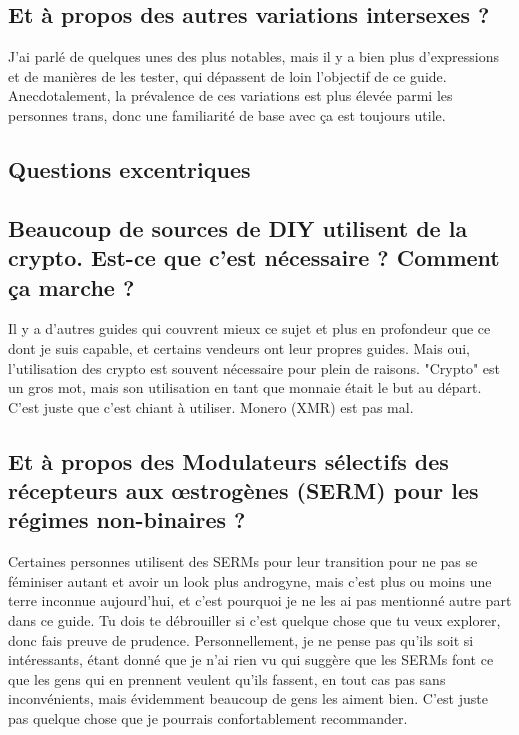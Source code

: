 \documentclass{article}
\begin{document}
\subsection{Et à propos des autres variations intersexes ?}

J'ai parlé de quelques unes des plus notables, mais il y a bien plus d'expressions et de manières de les tester, qui dépassent de loin l'objectif de ce guide. Anecdotalement, la prévalence de ces variations est plus élevée parmi les personnes trans, donc une familiarité de base avec ça est toujours utile.

\subsection*{Questions excentriques}

\subsection{Beaucoup de sources de DIY utilisent de la crypto. Est-ce que c'est nécessaire ? Comment ça marche ?}

Il y a d'autres guides qui couvrent mieux ce sujet et plus en profondeur que ce dont je suis capable, et certains vendeurs ont leur propres guides. Mais oui, l'utilisation des crypto est souvent nécessaire pour plein de raisons. "Crypto" est un gros mot, mais son utilisation en tant que monnaie était le but au départ. C'est juste que c'est chiant à utiliser. Monero (XMR) est pas mal.

\subsection{Et à propos des Modulateurs sélectifs des récepteurs aux œstrogènes (SERM) pour les régimes non-binaires ?}

Certaines personnes utilisent des SERMs pour leur transition pour ne pas se féminiser autant et avoir un look plus androgyne, mais c'est plus ou moins une terre inconnue aujourd'hui, et c'est pourquoi je ne les ai pas mentionné autre part dans ce guide. Tu dois te débrouiller si c'est quelque chose que tu veux explorer, donc fais preuve de prudence. Personnellement, je ne pense pas qu'ils soit si intéressants, étant donné que je n'ai rien vu qui suggère que les SERMs font ce que les gens qui en prennent veulent qu'ils fassent, en tout cas pas sans inconvénients, mais évidemment beaucoup de gens les aiment bien. C'est juste pas quelque chose que je pourrais confortablement recommander.
\end{document}
